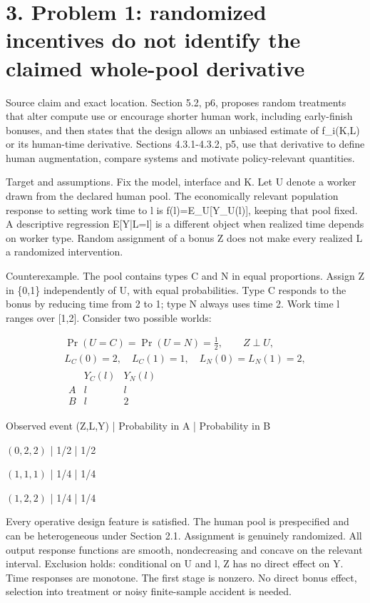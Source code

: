 \documentclass[10pt]{article}
\begin{document}
\section*{3. Problem 1: randomized incentives do not identify the claimed whole-pool derivative}
Source claim and exact location. Section 5.2, p6, proposes random treatments that alter compute use or encourage shorter human work, including early-finish bonuses, and then states that the design allows an unbiased estimate of f\_i(K,L) or its human-time derivative. Sections 4.3.1-4.3.2, p5, use that derivative to define human augmentation, compare systems and motivate policy-relevant quantities.\par
Target and assumptions. Fix the model, interface and K. Let U denote a worker drawn from the declared human pool. The economically relevant population response to setting work time to l is f(l)=E\_U[Y\_U(l)], keeping that pool fixed. A descriptive regression E[Y|L=l] is a different object when realized time depends on worker type. Random assignment of a bonus Z does not make every realized L a randomized intervention.\par
Counterexample. The pool contains types C and N in equal proportions. Assign Z in \{0,1\} independently of U, with equal probabilities. Type C responds to the bonus by reducing time from 2 to 1; type N always uses time 2. Work time l ranges over [1,2]. Consider two possible worlds:\par
\[\begin{gathered}
\Pr(U=C)=\Pr(U=N)=\tfrac12,\qquad Z\perp U,\\
L_C(0)=2,\quad L_C(1)=1,\quad L_N(0)=L_N(1)=2,\\
\begin{array}{c|cc}&Y_C(l)&Y_N(l)\\\hline A&l&l\\B&l&2\end{array}
\end{gathered}\]\par
Observed event (Z,L,Y) | Probability in A | Probability in B\par
\((0,2,2)\) | 1/2 | 1/2\par
\((1,1,1)\) | 1/4 | 1/4\par
\((1,2,2)\) | 1/4 | 1/4\par
Every operative design feature is satisfied. The human pool is prespecified and can be heterogeneous under Section 2.1. Assignment is genuinely randomized. All output response functions are smooth, nondecreasing and concave on the relevant interval. Exclusion holds: conditional on U and l, Z has no direct effect on Y. Time responses are monotone. The first stage is nonzero. No direct bonus effect, selection into treatment or noisy finite-sample accident is needed.\par
\end{document}
